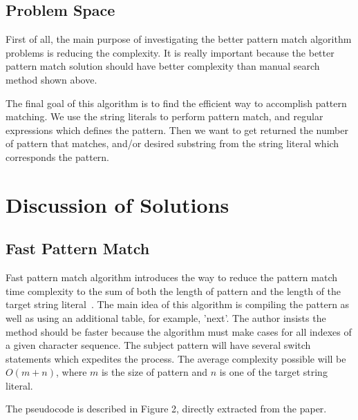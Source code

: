 \documentclass{acm_proc_article-sp}
\begin{document}
\subsection{Problem Space}
\begin{flushleft}
First of all, the main purpose of investigating the better pattern match algorithm problems is reducing the complexity. It is really important because the better pattern match solution should have better complexity than manual search method shown above.

The final goal of this algorithm is to find the efficient way to accomplish pattern matching. We use the string literals to perform pattern match, and regular expressions which defines the pattern. Then we want to get returned the number of pattern that matches, and/or desired substring from the string literal which corresponds the pattern.
\end{flushleft}

\section{Discussion of Solutions}
\subsection{Fast Pattern Match}
\begin{flushleft}
Fast pattern match algorithm introduces the way to reduce the pattern match time complexity to the sum of both the length of pattern and the length of the target string literal~\cite{Fast}. The main idea of this algorithm is compiling the pattern as well as using an additional table, for example, 'next'. The author insists the method should be faster because the algorithm must make cases for all indexes of a given character sequence. The subject pattern will have several switch statements which expedites the process. The average complexity possible will be $O(m + n)$, where $m$ is the size of pattern and $n$ is one of the target string literal.

The pseudocode is described in Figure 2, directly extracted from the paper.
\end{flushleft}
\end{document}
